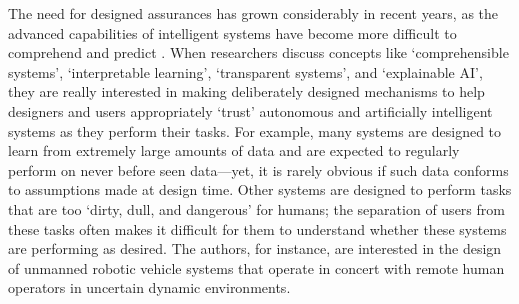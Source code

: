 

    The need for designed assurances has grown considerably in recent years, as the advanced capabilities of intelligent systems have become more difficult to comprehend and predict \cite{Doshi-Velez2017-xy, Weller2017-zx, Lipton2016-ug, Gunning2017-ih}. When researchers discuss concepts like `comprehensible systems', `interpretable learning', `transparent systems', and `explainable AI', they are really interested in making deliberately designed mechanisms to help designers and users appropriately `trust' autonomous and artificially intelligent systems as they perform their tasks. 
    For example, many systems are designed to learn from extremely large amounts of data and are expected to regularly perform on never before seen data---yet, it is rarely obvious if such data conforms to assumptions made at design time. 
    Other systems are designed to perform tasks that are too `dirty, dull, and dangerous' for humans; the separation of users from these tasks often makes it difficult for them to understand whether these systems are performing as desired. 
    The authors, for instance, are interested in the design of unmanned robotic vehicle systems that operate in concert with remote human operators in uncertain dynamic environments. 
